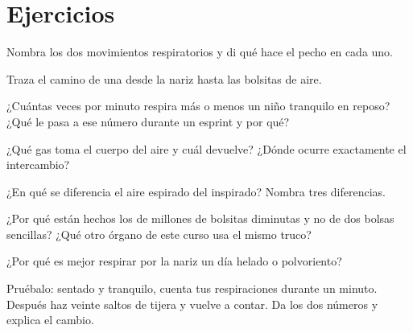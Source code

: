 \section{Ejercicios}

\begin{exercise}[$\star$]\label{exo:g4:breathing:1}
Nombra los dos movimientos respiratorios y di qué hace el pecho en cada
uno.
\end{exercise}

\begin{exercise}[$\star$]\label{exo:g4:breathing:2}
Traza el camino de una  desde la nariz hasta las bolsitas de aire.
\end{exercise}

\begin{exercise}[$\star$]\label{exo:g4:breathing:3}
¿Cuántas veces por minuto respira más o menos un niño tranquilo en
reposo? ¿Qué le pasa a ese número durante un esprint y por qué?
\end{exercise}

\begin{exercise}[$\star$]\label{exo:g4:breathing:4}
¿Qué gas toma el cuerpo del aire y cuál devuelve? ¿Dónde ocurre
exactamente el intercambio?
\end{exercise}

\begin{exercise}[$\star$]\label{exo:g4:breathing:5}
¿En qué se diferencia el aire espirado del inspirado? Nombra tres
diferencias.
\end{exercise}

\begin{exercise}[$\star$]\label{exo:g4:breathing:6}
¿Por qué están hechos los  de millones de bolsitas diminutas y
no de dos bolsas sencillas? ¿Qué otro órgano de este curso usa el
mismo truco?
\end{exercise}

\begin{exercise}[$\star$]\label{exo:g4:breathing:7}
¿Por qué es mejor respirar por la nariz un día helado o polvoriento?
\end{exercise}

\begin{exercise}[$\star$]\label{exo:g4:breathing:8}
Pruébalo: sentado y tranquilo, cuenta tus respiraciones durante un
minuto. Después haz veinte saltos de tijera y vuelve a contar. Da los
dos números y explica el cambio.
\end{exercise}

